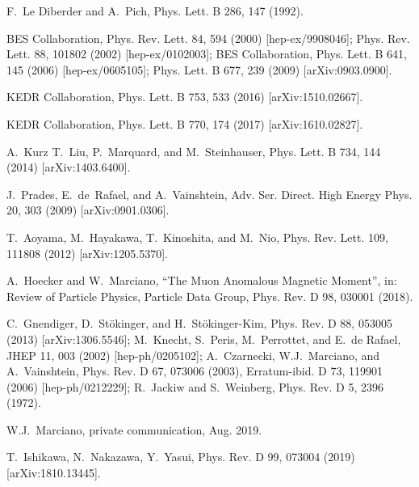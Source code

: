 \begin{thebibliography}{99}
       F.~Le Diberder and A.~Pich, Phys. Lett. B 286, 147 (1992). 

            BES Collaboration, 
                              Phys. Rev. Lett. 84, 594 (2000) [hep-ex/9908046];
                              Phys. Rev. Lett. 88, 101802 (2002) [hep-ex/0102003];
                          BES Collaboration,
                              Phys. Lett. B 641, 145 (2006) [hep-ex/0605105];
                              Phys. Lett. B 677, 239 (2009) [arXiv:0903.0900].

        KEDR Collaboration, Phys. Lett. B 753, 533 (2016) [arXiv:1510.02667].

        KEDR Collaboration,  Phys. Lett. B 770, 174 (2017) [arXiv:1610.02827].

      A.~Kurz T.~Liu, P.~Marquard, and M.~Steinhauser, 
                          Phys. Lett. B 734, 144 (2014) [arXiv:1403.6400].

         J.~Prades, E.~de~Rafael, and A.~Vainshtein,
                              Adv. Ser. Direct. High Energy Phys. 20, 303 (2009)  [arXiv:0901.0306].

         T.~Aoyama, M.~Hayakawa, T.~Kinoshita, and M.~Nio,
                              Phys. Rev. Lett. 109, 111808 (2012) [arXiv:1205.5370].

       A.~Hoecker and W.~Marciano,
                              ``The Muon Anomalous Magnetic Moment'',  
                              in: Review of Particle Physics, 
                            Particle Data Group, Phys. Rev. D 98, 030001 (2018).

     C.~Gnendiger, D.~St\"okinger, and H.~St\"okinger-Kim,
                              Phys. Rev. D 88, 053005 (2013) [arXiv:1306.5546];
                              M.~Knecht, S.~Peris, M.~Perrottet, and E.~de Rafael, 
                              JHEP 11, 003 (2002) [hep-ph/0205102];
                              A.~Czarnecki, W.J.~Marciano, and A.~Vainshtein,
                              Phys. Rev. D 67, 073006 (2003), 
                              Erratum-ibid. D 73, 119901 (2006) [hep-ph/0212229];
                              R.~Jackiw and S.~Weinberg, Phys. Rev. D 5, 2396 (1972).

 W.J.~Marciano, private communication, Aug. 2019.  

 T.~Ishikawa, N.~Nakazawa, Y.~Yasui, 
                              Phys. Rev. D 99, 073004 (2019) [arXiv:1810.13445].


\end{thebibliography}

